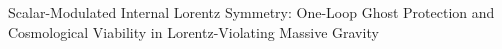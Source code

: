 \documentclass[twocolumn]{aastex631}
\begin{document}
Scalar-Modulated Internal Lorentz Symmetry: One-Loop Ghost Protection and Cosmological Viability in Lorentz-Violating Massive Gravity
\end{document}
